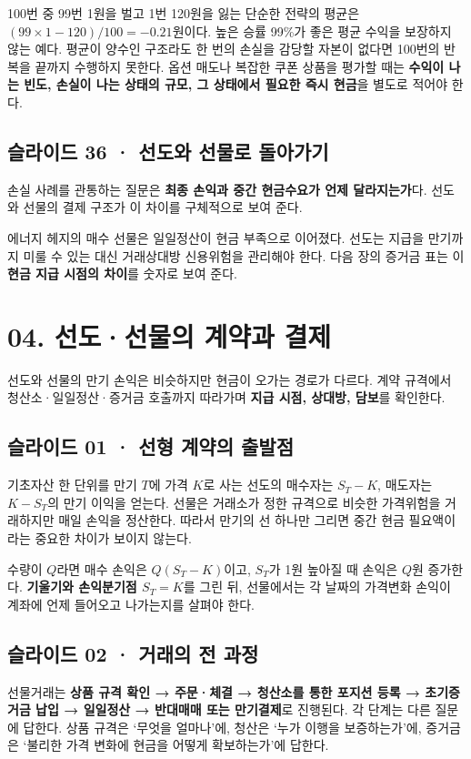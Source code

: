 \documentclass[11pt,a4paper]{article}
\begin{document}
100번 중 99번 1원을 벌고 1번 120원을 잃는 단순한 전략의 평균은 $(99\times1-120)/100=-0.21$원이다. 높은 승률 99\%가 좋은 평균 수익을 보장하지 않는 예다. 평균이 양수인 구조라도 한 번의 손실을 감당할 자본이 없다면 100번의 반복을 끝까지 수행하지 못한다. 옵션 매도나 복잡한 쿠폰 상품을 평가할 때는 \textbf{수익이 나는 빈도, 손실이 나는 상태의 규모, 그 상태에서 필요한 즉시 현금}을 별도로 적어야 한다.\par

\subsection{슬라이드 36 · 선도와 선물로 돌아가기}
손실 사례를 관통하는 질문은 \textbf{최종 손익과 중간 현금수요가 언제 달라지는가}다. 선도와 선물의 결제 구조가 이 차이를 구체적으로 보여 준다.\par

에너지 헤지의 매수 선물은 일일정산이 현금 부족으로 이어졌다. 선도는 지급을 만기까지 미룰 수 있는 대신 거래상대방 신용위험을 관리해야 한다. 다음 장의 증거금 표는 이 \textbf{현금 지급 시점의 차이}를 숫자로 보여 준다.\par

\section{04. 선도·선물의 계약과 결제}
선도와 선물의 만기 손익은 비슷하지만 현금이 오가는 경로가 다르다. 계약 규격에서 청산소·일일정산·증거금 호출까지 따라가며 \textbf{지급 시점, 상대방, 담보}를 확인한다.\par

\subsection{슬라이드 01 · 선형 계약의 출발점}
기초자산 한 단위를 만기 $T$에 가격 $K$로 사는 선도의 매수자는 $S_T-K$, 매도자는 $K-S_T$의 만기 이익을 얻는다. 선물은 거래소가 정한 규격으로 비슷한 가격위험을 거래하지만 매일 손익을 정산한다. 따라서 만기의 선 하나만 그리면 중간 현금 필요액이라는 중요한 차이가 보이지 않는다.\par

수량이 $Q$라면 매수 손익은 $Q(S_T-K)$이고, $S_T$가 1원 높아질 때 손익은 $Q$원 증가한다. \textbf{기울기와 손익분기점 $S_T=K$}를 그린 뒤, 선물에서는 각 날짜의 가격변화 손익이 계좌에 언제 들어오고 나가는지를 살펴야 한다.\par

\subsection{슬라이드 02 · 거래의 전 과정}
선물거래는 \textbf{상품 규격 확인 → 주문·체결 → 청산소를 통한 포지션 등록 → 초기증거금 납입 → 일일정산 → 반대매매 또는 만기결제}로 진행된다. 각 단계는 다른 질문에 답한다. 상품 규격은 ‘무엇을 얼마나’에, 청산은 ‘누가 이행을 보증하는가’에, 증거금은 ‘불리한 가격 변화에 현금을 어떻게 확보하는가’에 답한다.\par
\end{document}
